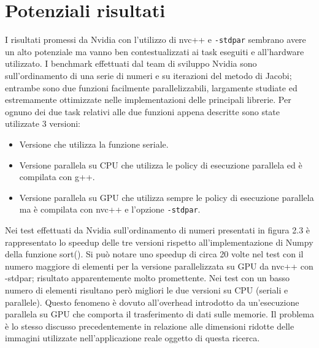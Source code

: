 \documentclass[12pt,a4paper]{report}
\begin{document}
\section{Potenziali risultati}

I risultati promessi da Nvidia con l'utilizzo di nvc++ e \verb|-stdpar| sembrano avere un alto potenziale ma vanno ben contestualizzati ai task eseguiti e all'hardware utilizzato. \newline
I benchmark effettuati dal team di sviluppo Nvidia sono sull'ordinamento di una serie di numeri e su iterazioni del metodo di Jacobi; entrambe sono due funzioni facilmente parallelizzabili, largamente studiate ed estremamente ottimizzate nelle implementazioni delle principali librerie.
Per ognuno dei due task relativi alle due funzioni appena descritte sono state utilizzate 3 versioni:
\begin{itemize}
\item Versione che utilizza la funzione seriale.
\item Versione parallela su CPU che utilizza le policy di esecuzione parallela ed è compilata con g++.
\item Versione parallela su GPU che utilizza sempre le policy di esecuzione parallela ma è compilata con nvc++ e l'opzione \verb|-stdpar|.
\end{itemize}

Nei test effettuati da Nvidia sull'ordinamento di numeri presentati in figura 2.3 è rappresentato lo speedup delle tre versioni rispetto all'implementazione di Numpy della funzione sort(). Si può notare uno speedup di circa 20 volte nel test con il numero maggiore di elementi per la versione parallelizzata su GPU da nvc++ con -stdpar; risultato apparentemente molto promettente. Nei test con un basso numero di elementi risultano però migliori le due versioni su CPU (seriali e parallele). Questo fenomeno è dovuto all'overhead introdotto da un'esecuzione parallela su GPU che comporta il trasferimento di dati sulle memorie. Il problema è lo stesso discusso precedentemente in relazione alle dimensioni ridotte delle immagini utilizzate nell'applicazione reale oggetto di questa ricerca.
\end{document}
